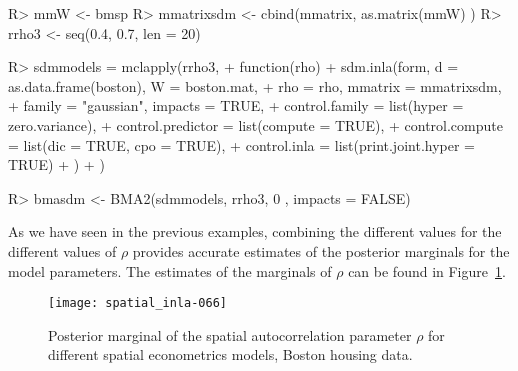 \documentclass[article]{jss}
\begin{document}
\begin{Schunk}
\begin{Sinput}
R> mmW <- bmsp %*% mmatrix[,-1]#Remove intercept
R> mmatrixsdm <- cbind(mmatrix, as.matrix(mmW) )
R> rrho3 <- seq(0.4, 0.7, len = 20)
\end{Sinput}
\end{Schunk}

\begin{Schunk}
\begin{Sinput}
R> sdmmodels = mclapply(rrho3,
+          function(rho) {
+                  sdm.inla(form, d = as.data.frame(boston), W = boston.mat, 
+  			rho = rho, mmatrix = mmatrixsdm,
+                          family = "gaussian", impacts = TRUE,
+                          control.family = list(hyper = zero.variance),
+                          control.predictor = list(compute = TRUE),
+                          control.compute = list(dic = TRUE, cpo = TRUE),
+                          control.inla = list(print.joint.hyper = TRUE)
+                  )
+          })
\end{Sinput}
\end{Schunk}

\begin{Schunk}
\begin{Sinput}
R> bmasdm <- BMA2(sdmmodels, rrho3, 0 , impacts = FALSE)
\end{Sinput}
\end{Schunk}

As we have seen in the previous examples, combining the different values 
for the different values of $\rho$ provides accurate estimates of the posterior
marginals for the model parameters. The estimates of the marginals of
$\rho$ can be found in Figure~\ref{fig:pmargrho}.

\begin{figure}[h]
\begin{center}
\texttt{[image: spatial\_inla-066]}
\end{center}
\caption{Posterior marginal of the spatial autocorrelation parameter $\rho$
for different spatial econometrics models, Boston housing data.}
\label{fig:pmargrho}
\end{figure} 




\end{document}
